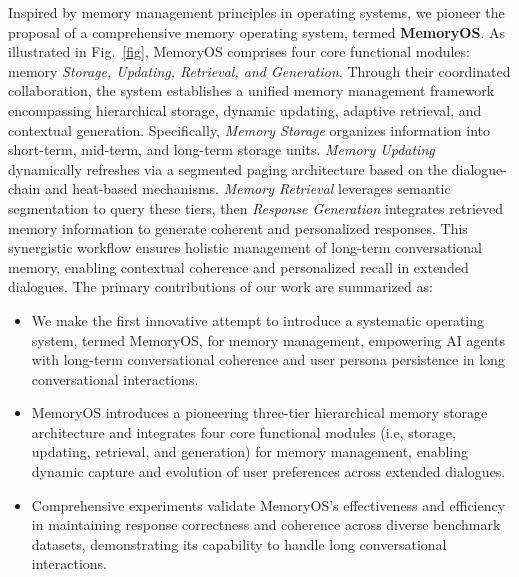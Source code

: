 \documentclass[11pt]{article}
\begin{document}
Inspired by memory management principles in operating systems, we pioneer the proposal of a comprehensive memory operating system, termed \textbf{MemoryOS}.
As illustrated in Fig.~\ref{fig}, MemoryOS comprises four core functional modules: memory \emph{Storage, Updating, Retrieval, and Generation}. 
Through their coordinated collaboration, the system establishes a unified memory management framework encompassing hierarchical storage, dynamic updating, adaptive retrieval, and contextual generation. 
Specifically, \emph{Memory Storage} organizes information into short-term, mid-term, and long-term storage units. \emph{Memory Updating} dynamically refreshes via a segmented paging architecture based on the dialogue-chain and heat-based mechanisms. \emph{Memory Retrieval} leverages semantic segmentation to query these tiers, then \emph{Response Generation} integrates retrieved memory information to generate coherent and personalized responses.
This synergistic workflow ensures holistic management of long-term conversational memory, enabling contextual coherence and personalized recall in extended dialogues.
The primary contributions of our work are summarized as:
\begin{itemize}
\item We make the first innovative attempt to introduce a systematic operating system, termed MemoryOS, for memory management, empowering AI agents with long-term conversational coherence and user persona persistence in long conversational interactions.

\item 
MemoryOS introduces a pioneering three-tier hierarchical memory storage architecture and integrates four core functional modules (i.e, storage, updating, retrieval, and generation) for memory management, enabling dynamic capture and evolution of user preferences across extended dialogues.

\item 
Comprehensive experiments validate MemoryOS's effectiveness and efficiency in maintaining response correctness and coherence across diverse benchmark datasets, demonstrating its capability to handle long conversational interactions.
\end{itemize}
\end{document}
